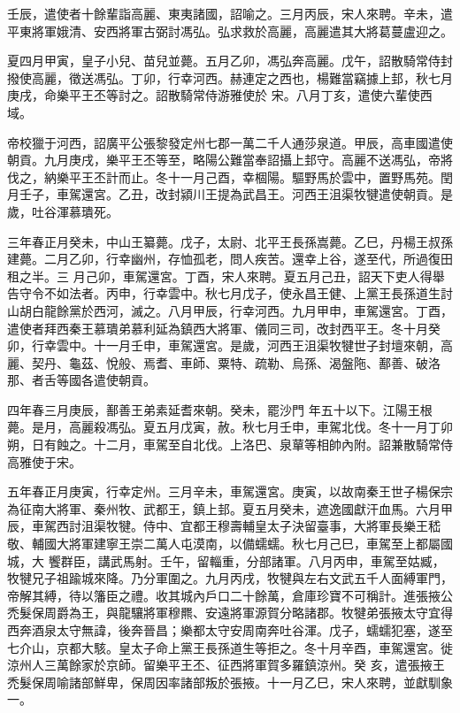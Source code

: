 \begin{pinyinscope}
 壬辰，遣使者十餘輩詣高麗、東夷諸國，詔喻之。三月丙辰，宋人來聘。辛未，遣平東將軍娥清、安西將軍古弼討馮弘。弘求救於高麗，高麗遣其大將葛蔓盧迎之。



 夏四月甲寅，皇子小兒、苗兒並薨。五月乙卯，馮弘奔高麗。戊午，詔散騎常侍封撥使高麗，徵送馮弘。丁卯，行幸河西。赫連定之西也，楊難當竊據上邽，秋七月庚戌，命樂平王丕等討之。詔散騎常侍游雅使於
 宋。八月丁亥，遣使六輩使西域。



 帝校獵于河西，詔廣平公張黎發定州七郡一萬二千人通莎泉道。甲辰，高車國遣使朝貢。九月庚戌，樂平王丕等至，略陽公難當奉詔攝上邽守。高麗不送馮弘，帝將伐之，納樂平王丕計而止。冬十一月己酉，幸棝陽。驅野馬於雲中，置野馬苑。閏月壬子，車駕還宮。乙丑，改封潁川王提為武昌王。河西王沮渠牧犍遣使朝貢。是歲，吐谷渾慕璝死。



 三年春正月癸未，中山王纂薨。戊子，太尉、北平王長孫嵩薨。乙巳，丹楊王叔孫建薨。二月乙卯，行幸幽州，存恤孤老，問人疾苦。還幸上谷，遂至代，所過復田租之半。三
 月己卯，車駕還宮。丁酉，宋人來聘。夏五月己丑，詔天下吏人得舉告守令不如法者。丙申，行幸雲中。秋七月戊子，使永昌王健、上黨王長孫道生討山胡白龍餘黨於西河，滅之。八月甲辰，行幸河西。九月甲申，車駕還宮。丁酉，遣使者拜西秦王慕璝弟慕利延為鎮西大將軍、儀同三司，改封西平王。冬十月癸卯，行幸雲中。十一月壬申，車駕還宮。是歲，河西王沮渠牧犍世子封壇來朝，高麗、契丹、龜茲、悅般、焉耆、車師、粟特、疏勒、烏孫、渴盤陁、鄯善、破洛那、者舌等國各遣使朝貢。



 四年春三月庚辰，鄯善王弟素延耆來朝。癸未，罷沙門
 年五十以下。江陽王根薨。是月，高麗殺馮弘。夏五月戊寅，赦。秋七月壬申，車駕北伐。冬十一月丁卯朔，日有蝕之。十二月，車駕至自北伐。上洛巴、泉蕇等相帥內附。詔兼散騎常侍高雅使于宋。



 五年春正月庚寅，行幸定州。三月辛未，車駕還宮。庚寅，以故南秦王世子楊保宗為征南大將軍、秦州牧、武都王，鎮上邽。夏五月癸未，遮逸國獻汗血馬。六月甲辰，車駕西討沮渠牧犍。侍中、宜都王穆壽輔皇太子決留臺事，大將軍長樂王嵇敬、輔國大將軍建寧王崇二萬人屯漠南，以備蠕蠕。秋七月己巳，車駕至上都屬國城，大
 饗群臣，講武馬射。壬午，留輜重，分部諸軍。八月丙申，車駕至姑臧，牧犍兄子祖踰城來降。乃分軍圍之。九月丙戌，牧犍與左右文武五千人面縛軍門，帝解其縛，待以籓臣之禮。收其城內戶口二十餘萬，倉庫珍寶不可稱計。進張掖公禿髮保周爵為王，與龍驤將軍穆羆、安遠將軍源賀分略諸郡。牧犍弟張掖太守宜得西奔酒泉太守無諱，後奔晉昌；樂都太守安周南奔吐谷渾。戊子，蠕蠕犯塞，遂至七介山，京都大駭。皇太子命上黨王長孫道生等拒之。冬十月辛酉，車駕還宮。徙涼州人三萬餘家於京師。留樂平王丕、征西將軍賀多羅鎮涼州。癸
 亥，遣張掖王禿髮保周喻諸部鮮卑，保周因率諸部叛於張掖。十一月乙巳，宋人來聘，並獻馴象一。




\end{pinyinscope}
